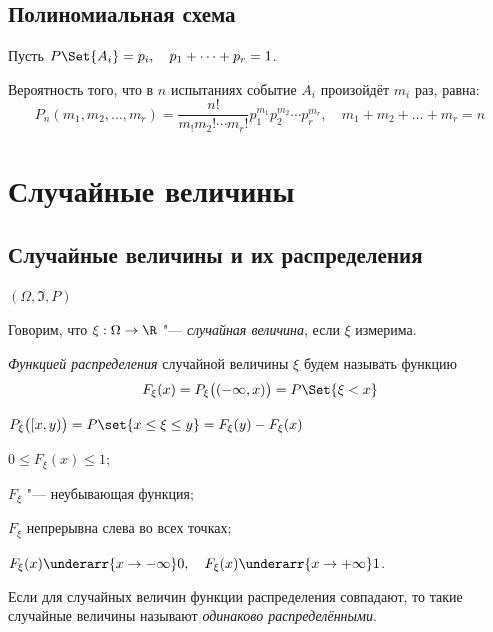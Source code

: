 \section{Полиномиальная схема}

\begin{definition}
	Пусть $ P\Set{A_i} = p_i, \quad p_1 + \dots + p_r = 1 $.

	Вероятность того, что в $ n $ испытаниях событие $ A_i $ произойдёт $ m_i $ раз, равна:
	$$ P_n(m_1, m_2, \dots, m_r) =
	\frac{n!}{m_! m_2! \cdots m_r!} p_1^{m_1} p_2^{m_2} \cdots p_r^{m_r}, \quad
	m_1 + m_2 + \dots + m_r = n $$
\end{definition}

\chapter{Случайные величины}

\section{Случайные величины и их распределения}

\begin{definition}
	$ (\Omega, \Im, P) $

	Говорим, что $ \xi : \Omega \to \R $ "--- \emph{случайная величина}, если $ \xi $ измерима.
\end{definition}

\begin{definition}
	\emph{Функцией распределения} случайной величины $ \xi $ будем называть функцию
	$$ F_\xi(x) = P_\xi \bigl( (-\infty, x) \bigr) = P \Set{\xi < x} $$
\end{definition}

\begin{remark}
	$ P_\xi \bigl( [x, y) \bigr) = P \set{x \le \xi \le y} = F_\xi(y) - F_\xi(x) $
\end{remark}

\begin{props}
\item $ 0 \le F_\xi(x) \le 1 $;
\item $ F_\xi $ "--- неубывающая функция;
\item $ F_\xi $ непрерывна слева во всех точках;
\item $ F_\xi(x) \underarr{x \to -\infty} 0, \quad F_\xi(x) \underarr{x \to +\infty} 1 $.
\end{props}

\begin{definition}
	Если для случайных величин функции распределения совпадают, то такие
	случайные величины называют \emph{одинаково распределёнными}.
\end{definition}

